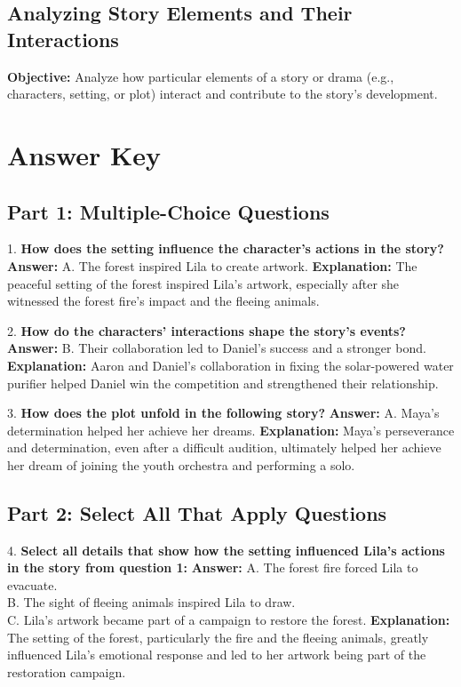 \documentclass[12pt]{article}
\begin{document}
\subsection*{Analyzing Story Elements and Their Interactions}
\onehalfspacing

\begin{tcolorbox}[colframe=black!40, colback=gray!0, title=Learning Objective]
\textbf{Objective:} Analyze how particular elements of a story or drama (e.g., characters, setting, or plot) interact and contribute to the story's development.
\end{tcolorbox}


\section*{Answer Key}

\subsection*{Part 1: Multiple-Choice Questions}

1. \textbf{How does the setting influence the character’s actions in the story?}  
\textbf{Answer:} A. The forest inspired Lila to create artwork.  
\textbf{Explanation:} The peaceful setting of the forest inspired Lila’s artwork, especially after she witnessed the forest fire’s impact and the fleeing animals.

\vspace{1cm}
2. \textbf{How do the characters' interactions shape the story’s events?}  
\textbf{Answer:} B. Their collaboration led to Daniel’s success and a stronger bond.  
\textbf{Explanation:} Aaron and Daniel’s collaboration in fixing the solar-powered water purifier helped Daniel win the competition and strengthened their relationship.

\vspace{1cm}
3. \textbf{How does the plot unfold in the following story?}  
\textbf{Answer:} A. Maya’s determination helped her achieve her dreams.  
\textbf{Explanation:} Maya’s perseverance and determination, even after a difficult audition, ultimately helped her achieve her dream of joining the youth orchestra and performing a solo.

\subsection*{Part 2: Select All That Apply Questions}

4. \textbf{Select all details that show how the setting influenced Lila’s actions in the story from question 1:}  
\textbf{Answer:} A. The forest fire forced Lila to evacuate. \\
B. The sight of fleeing animals inspired Lila to draw. \\
C. Lila’s artwork became part of a campaign to restore the forest.  
\textbf{Explanation:} The setting of the forest, particularly the fire and the fleeing animals, greatly influenced Lila’s emotional response and led to her artwork being part of the restoration campaign.
\end{document}

